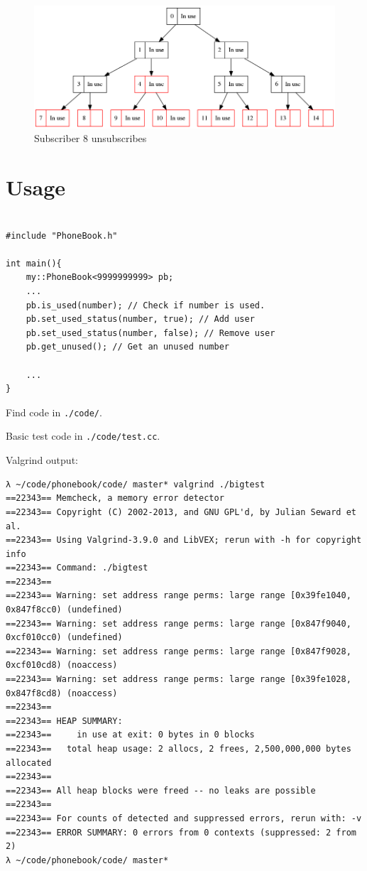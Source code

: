\documentclass{article}
\begin{document}
\begin{figure}[H]
    \includegraphics[width=\textwidth]{minuseight}
    \caption{Subscriber 8 unsubscribes}
    \label{fig:minuseight}
\end{figure}


\newpage
\section{Usage}

\begin{verbatim}

#include "PhoneBook.h"

int main(){
    my::PhoneBook<9999999999> pb;
    ...
    pb.is_used(number); // Check if number is used. 
    pb.set_used_status(number, true); // Add user 
    pb.set_used_status(number, false); // Remove user 
    pb.get_unused(); // Get an unused number 

    ...
}

\end{verbatim}


Find code in \texttt{./code/}. 

Basic test code in \texttt{./code/test.cc}. 

Valgrind output: 


\begin{verbatim}
λ ~/code/phonebook/code/ master* valgrind ./bigtest
==22343== Memcheck, a memory error detector
==22343== Copyright (C) 2002-2013, and GNU GPL'd, by Julian Seward et al.
==22343== Using Valgrind-3.9.0 and LibVEX; rerun with -h for copyright info
==22343== Command: ./bigtest
==22343== 
==22343== Warning: set address range perms: large range [0x39fe1040, 0x847f8cc0) (undefined)
==22343== Warning: set address range perms: large range [0x847f9040, 0xcf010cc0) (undefined)
==22343== Warning: set address range perms: large range [0x847f9028, 0xcf010cd8) (noaccess)
==22343== Warning: set address range perms: large range [0x39fe1028, 0x847f8cd8) (noaccess)
==22343== 
==22343== HEAP SUMMARY:
==22343==     in use at exit: 0 bytes in 0 blocks
==22343==   total heap usage: 2 allocs, 2 frees, 2,500,000,000 bytes allocated
==22343== 
==22343== All heap blocks were freed -- no leaks are possible
==22343== 
==22343== For counts of detected and suppressed errors, rerun with: -v
==22343== ERROR SUMMARY: 0 errors from 0 contexts (suppressed: 2 from 2)
λ ~/code/phonebook/code/ master* 

\end{verbatim}
\end{document}
